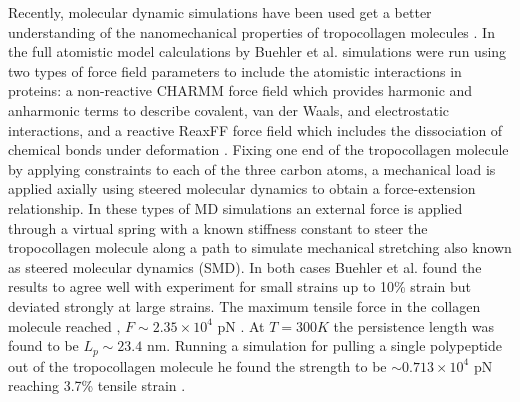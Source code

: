 Recently, molecular dynamic simulations have been used get a better understanding of the nanomechanical properties of tropocollagen molecules \cite{Buehler2007, Lorenzo2005, Buehler2006a, Gautieri2010}. In the full atomistic model calculations by Buehler et al. simulations were run using two types of force field parameters to include the atomistic interactions in proteins: a non-reactive CHARMM force field which provides harmonic and anharmonic terms to describe covalent, van der Waals, and electrostatic interactions, and a reactive ReaxFF force field which includes the dissociation of chemical bonds under deformation \cite{Buehler2006a, Buehler2007}. Fixing one end of the tropocollagen molecule by applying constraints to each of the three carbon atoms, a mechanical load is applied axially using steered molecular dynamics to obtain a force-extension relationship. In these types of MD simulations an external force is applied through a virtual spring with a known stiffness constant to steer the tropocollagen molecule along a path to simulate mechanical stretching also known as steered molecular dynamics (SMD). In both cases Buehler et al. found the results to agree well with experiment for small strains up to 10\% strain but deviated strongly at large strains. The maximum tensile force in the collagen molecule reached , $F \sim 2.35 \times 10^{4} \text{ pN}$ . At $T=300K$ the persistence length was found to be $L_{p} \sim 23.4 \text{ nm}$. Running a simulation for pulling a single polypeptide out of the tropocollagen molecule he found the strength to be $\sim 0.713 \times 10^{4} \text{ pN}$ reaching 3.7\% tensile strain \cite{Buehler2006a}.

